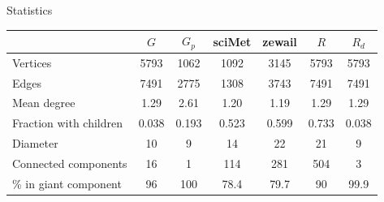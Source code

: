 \documentclass[xcolor=dvipsnames, 14pt]{beamer}
\begin{document}
\begin{frame}{Statistics}
\centering
\footnotesize
\begin{tabular}{| l | c | c | c | c | c | c |}
\hline
 & $G$ & $G_p$ & sciMet & zewail & $R$ & $R_d$ \\ \hline\hline
Vertices & 5793 & 1062 & 1092 & 3145 & 5793 & 5793 \\ \hline
Edges & 7491 & 2775 & 1308 & 3743 & 7491 & 7491\\ \hline 
Mean degree & 1.29 & 2.61 & 1.20 & 1.19 & 1.29 & 1.29 \\ \hline 
Fraction with children & 0.038 & 0.193 & 0.523 & 0.599 & 0.733 & 0.038 \\ \hline 
Diameter & 10 & 9 & 14 & 22 & 21 & 9\\ \hline 
Connected components & 16 & 1 & 114 & 281 & 504 & 3 \\ \hline 
\% in giant component & 96 & 100 & 78.4 & 79.7 & 90 & 99.9 \\ \hline 
\end{tabular}
\end{frame}
\end{document}
